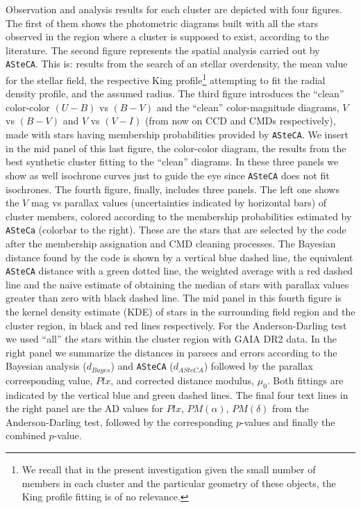 \documentclass{aa}
\begin{document}
Observation and analysis results for each cluster are depicted
with four figures. The first of them shows the photometric diagrams built with
all the stars observed in the region where a cluster is supposed to exist,
according to the literature.
The second figure represents the spatial analysis carried out by
\texttt{ASteCA}. This is: results from the search of an stellar overdensity, the
mean value for the stellar field, the respective King profile\footnote{We
recall that in the present investigation given the small number of members in
each cluster and the particular geometry of these objects, the King profile
fitting is of no relevance.} attempting to fit the radial density profile, and
the assumed radius.
The third figure introduces the ``clean'' color-color $(U-B)$ vs $(B-V)$ and
the ``clean'' color-magnitude diagrams, $V$ vs $(B-V)$ and $V$ vs $(V-I)$ (from
now on CCD and CMDs respectively), made with stars
having membership probabilities provided by \texttt{ASteCA}. We insert in the
mid panel of this last figure, the color-color diagram, the results from the
best synthetic cluster fitting to the ``clean'' diagrams. In these three panels
we show as well isochrone curves just to guide the eye since \texttt{ASteCA}
does not fit isochrones.
%
The fourth figure, finally, includes three panels. The left one shows the
$V$ mag vs parallax values (uncertainties indicated by horizontal bars) of
cluster members, colored according to the membership probabilities
estimated by \texttt{ASteCa} (colorbar to the right). These are the stars that
are selected by the code after the membership assignation and CMD cleaning
processes.
%
The Bayesian distance found by the code is shown by a vertical blue dashed line,
the equivalent \texttt{ASteCA} distance with a green dotted line, the weighted
average with a red dashed line and the naive estimate of obtaining the median of
stars with parallax values greater than zero with black dashed line.
%
The mid panel in this fourth figure is the kernel density estimate (KDE) of
stars in the surrounding field region and the cluster region, in black and red
lines respectively. For the Anderson-Darling test we used ``all'' the
stars within the cluster region with GAIA DR2 data. In the right panel we
summarize the distances in parsecs and errors according to the Bayesian analysis
($d_{Bayes}$) and \texttt{ASteCA} ($d_{ASteCA}$) followed by the parallax
corresponding value, $Plx$, and corrected distance modulus, $\mu_0$. Both
fittings are indicated by the vertical blue and green dashed lines. The final
four text lines in the right panel are the AD values for $Plx$, $PM(\alpha)$,
$PM(\delta)$ from the Anderson-Darling test, followed by the corresponding
$p$-values and finally the combined $p$-value.\\
\end{document}
